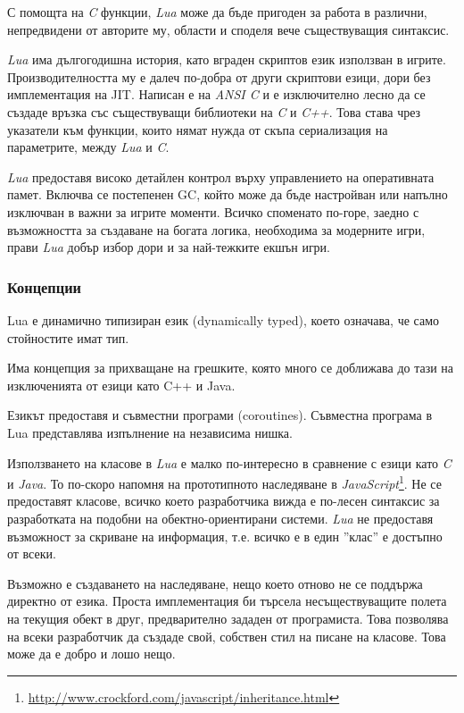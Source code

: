 		С помощта на \emph{C} функции, \emph{Lua} може да бъде пригоден за работа в различни, непредвидени от авторите му,
		области и споделя вече съществуващия синтаксис.
		
		\emph{Lua} има дългогодишна история, като вграден скриптов език използван в игрите. Производителността му
		е далеч по-добра от други скриптови езици, дори без имплементация на \ac{JIT}. Написан е на
		\emph{ANSI C} и е изключително лесно да се създаде връзка със съществуващи библиотеки на \emph{C} и \emph{C++}.
		Това става чрез указатели към функции, които нямат нужда от скъпа сериализация на параметрите, между \emph{Lua} и \emph{C}.
		
		\emph{Lua} предоставя високо детайлен контрол върху управлението на оперативната памет. Включва се
		постепенен \ac{GC}, който може да бъде настройван или напълно изключван в важни за игрите моменти.
		Всичко споменато по-горе, заедно с възможността за създаване на богата логика, необходима за модерните игри,
		прави \emph{Lua} добър избор дори и за най-тежките екшън игри.		
		
		\subsubsection{Концепции}					
		
			Lua е динамично типизиран език (dynamically typed), което означава, че само стойностите имат тип.			
			
			Има концепция за прихващане на грешките, която много се доближава до тази на изключенията от езици като
			C++ и Java.
			
			Езикът предоставя и съвместни програми (coroutines). Съвместна програма в Lua представлява изпълнение на независима нишка.		
			
			Използването на класове в \emph{Lua} е малко по-интересно в сравнение с езици като \emph{C} и \emph{Java}. 
			То по-скоро напомня на прототипното наследяване в
			\emph{JavaScript}\footnote{\url{http://www.crockford.com/javascript/inheritance.html}}.
			Не се предоставят класове, всичко което разработчика вижда е по-лесен синтаксис за разработката 
			на подобни на обектно-ориентирани системи.
			\emph{Lua} не предоставя възможност за скриване на информация, т.е. всичко е в един ''клас'' е достъпно
			от всеки. 
			
			Възможно е създаването на наследяване, нещо което отново не се поддържа директно от езика. Проста имплементация
			би търсела несъществуващите полета на текущия обект в друг, предварително зададен от програмиста. \cite{Figueiredo}
			Това позволява на всеки разработчик да създаде свой, собствен стил на писане на класове. Това може да е добро и лошо нещо.
			

